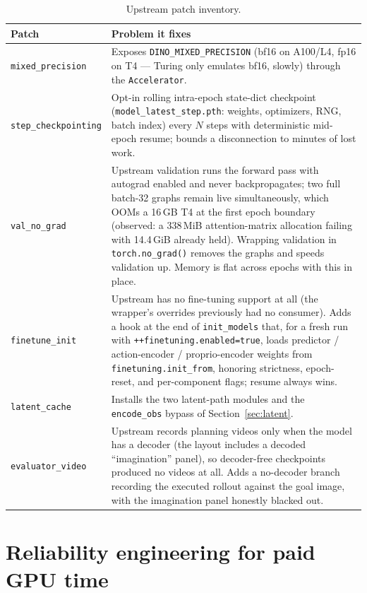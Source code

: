 \documentclass[11pt]{article}
\begin{document}
\begin{table}[h]
\centering
\small
\begin{tabular}{p{4.2cm}p{9.6cm}}
\toprule
Patch & Problem it fixes \\
\midrule
\texttt{mixed\_precision} & Exposes \texttt{DINO\_MIXED\_PRECISION}
  (bf16 on A100/L4, fp16 on T4 --- Turing only emulates bf16, slowly)
  through the \texttt{Accelerator}. \\
\texttt{step\_checkpointing} & Opt-in rolling intra-epoch state-dict
  checkpoint (\texttt{model\_latest\_step.pth}: weights, optimizers, RNG,
  batch index) every $N$ steps with deterministic mid-epoch resume; bounds a
  disconnection to minutes of lost work. \\
\texttt{val\_no\_grad} & Upstream validation runs the forward pass with
  autograd enabled and never backpropagates; two full batch-32 graphs remain
  live simultaneously, which OOMs a 16\,GB T4 at the first epoch boundary
  (observed: a 338\,MiB attention-matrix allocation failing with 14.4\,GiB
  already held). Wrapping validation in \texttt{torch.no\_grad()} removes the
  graphs and speeds validation up. Memory is flat across epochs with this in
  place. \\
\texttt{finetune\_init} & Upstream has no fine-tuning support at all (the
  wrapper's overrides previously had no consumer). Adds a hook at the end of
  \texttt{init\_models} that, for a fresh run with
  \texttt{++finetuning.enabled=true}, loads predictor / action-encoder /
  proprio-encoder weights from \texttt{finetuning.init\_from}, honoring
  strictness, epoch-reset, and per-component flags; resume always wins. \\
\texttt{latent\_cache} & Installs the two latent-path modules and the
  \texttt{encode\_obs} bypass of Section~\ref{sec:latent}. \\
\texttt{evaluator\_video} & Upstream records planning videos only when the
  model has a decoder (the layout includes a decoded ``imagination'' panel),
  so decoder-free checkpoints produced no videos at all. Adds a no-decoder
  branch recording the executed rollout against the goal image, with the
  imagination panel honestly blacked out. \\
\bottomrule
\end{tabular}
\caption{Upstream patch inventory.}
\label{tab:patches}
\end{table}

\section{Reliability engineering for paid GPU time}
\label{sec:reliability}
\end{document}
